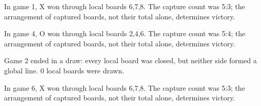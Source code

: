 In game 1, X won through local boards 6,7,8. The capture count was 5:3; the arrangement of captured boards, not their total alone, determines victory.

In game 4, O won through local boards 2,4,6. The capture count was 5:4; the arrangement of captured boards, not their total alone, determines victory.

Game 2 ended in a draw: every local board was closed, but neither side formed a global line. 0 local boards were drawn.

In game 6, X won through local boards 6,7,8. The capture count was 5:3; the arrangement of captured boards, not their total alone, determines victory.

